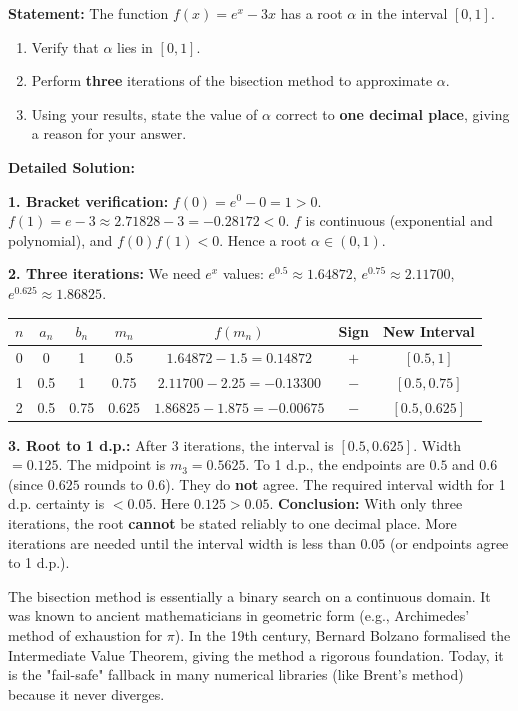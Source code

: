 \documentclass[11pt]{article}
\begin{document}
\begin{exoresolu}
\textbf{Statement:} The function $f(x)=e^x - 3x$ has a root $\alpha$ in the interval $[0,1]$.
\begin{enumerate}
    \item Verify that $\alpha$ lies in $[0,1]$.
    \item Perform \textbf{three} iterations of the bisection method to approximate $\alpha$.
    \item Using your results, state the value of $\alpha$ correct to \textbf{one decimal place}, giving a reason for your answer.
\end{enumerate}

\tcblower
\textbf{Detailed Solution:}

\textbf{1. Bracket verification:}
$f(0)=e^0-0=1 > 0$.
$f(1)=e-3 \approx 2.71828-3 = -0.28172 < 0$.
$f$ is continuous (exponential and polynomial), and $f(0)f(1)<0$. Hence a root $\alpha \in (0,1)$.

\textbf{2. Three iterations:}
We need $e^x$ values: $e^{0.5}\approx1.64872$, $e^{0.75}\approx2.11700$, $e^{0.625}\approx1.86825$.

\begin{center}
\begin{tabular}{|c|c|c|c|c|c|c|}
\hline
$n$ & $a_n$ & $b_n$ & $m_n$ & $f(m_n)$ & Sign & New Interval \\ \hline
0 & 0 & 1 & 0.5 & $1.64872 - 1.5 = 0.14872$ & $+$ & $[0.5, 1]$ \\ \hline
1 & 0.5 & 1 & 0.75 & $2.11700 - 2.25 = -0.13300$ & $-$ & $[0.5, 0.75]$ \\ \hline
2 & 0.5 & 0.75 & 0.625 & $1.86825 - 1.875 = -0.00675$ & $-$ & $[0.5, 0.625]$ \\ \hline
\end{tabular}
\end{center}

\textbf{3. Root to 1 d.p.:}
After 3 iterations, the interval is $[0.5, 0.625]$. Width $=0.125$.
The midpoint is $m_3 = 0.5625$.
To 1 d.p., the endpoints are $0.5$ and $0.6$ (since $0.625$ rounds to $0.6$). They do \textbf{not} agree.
The required interval width for 1 d.p. certainty is $<0.05$. Here $0.125 > 0.05$.
\textbf{Conclusion:} With only three iterations, the root \textbf{cannot} be stated reliably to one decimal place. More iterations are needed until the interval width is less than $0.05$ (or endpoints agree to 1 d.p.).
\end{exoresolu}

\begin{savaistu}
The bisection method is essentially a binary search on a continuous domain. It was known to ancient mathematicians in geometric form (e.g., Archimedes' method of exhaustion for $\pi$). In the 19th century, Bernard Bolzano formalised the Intermediate Value Theorem, giving the method a rigorous foundation. Today, it is the "fail-safe" fallback in many numerical libraries (like Brent's method) because it never diverges.
\end{savaistu}
\end{document}
